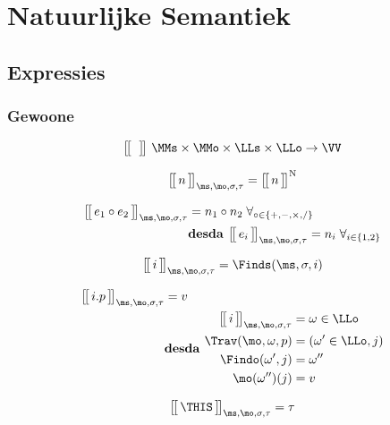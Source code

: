 \chapter{Natuurlijke Semantiek}

\section{Expressies}

\subsection{Gewoone}

\begin{equation*}
  \Express{\;}{} \; \MMs \times \MMo \times \LLs \times \LLo \rightarrow \VV
\end{equation*}

\begin{equation*}
  \Express{n}{\ms,\mo,\sigma,\tau} = \Express[N]{n}{}
\end{equation*}

\begin{align*}
  \Express{e_1 \circ e_2}{\ms,\mo,\sigma,\tau}
  &= n_1 \circ n_2
  \;\forall_{\circ\in\{+,-,\times,/\}}\\
  &\desda \Express{e_i}{\ms,\mo,\sigma,\tau} = n_i \;\forall_{i\in\{1,2\}}
\end{align*}

\begin{equation*}
  \Express{i}{\ms,\mo,\sigma,\tau} = \Finds(\ms,\sigma,i)
\end{equation*}

\begin{align*}
  \Express{i.p}{\ms,\mo,\sigma,\tau} &= v \\
                                     &\desda
  \begin{aligned}
    \Express{i}{\ms,\mo,\sigma,\tau} &= \omega \in \LLo \\
                 \Trav(\mo,\omega,p) &= (\omega'\in\LLo,j) \\
                   \Findo(\omega',j) &= \omega'' \\
                    \mo(\omega'')(j) &= v
  \end{aligned}
\end{align*}

\begin{equation*}
  \Express{\THIS}{\ms,\mo,\sigma,\tau} = \tau
\end{equation*}


